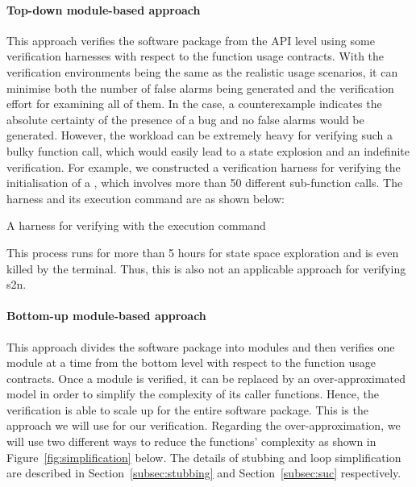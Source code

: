 \paragraph{Top-down module-based approach} This approach verifies the software package from the API level using some verification harnesses with respect to the function usage contracts. With the verification environments being the same as the realistic usage scenarios, it can minimise both the number of false alarms being generated and the verification effort for examining all of them. In the case, a counterexample indicates the absolute certainty of the presence of a bug and no false alarms would be generated.
However, the workload can be extremely heavy for verifying such a bulky function call, which would easily lead to a state explosion and an indefinite verification. For example, we constructed a verification harness for verifying the initialisation of a , which involves more than 50 different sub-function calls. The harness and its execution command are as shown below:

\begin{listing}[ht]


\caption{A harness for verifying  with the execution command}
\label{listing:s2n_test_harness}
\end{listing}

This process runs for more than 5 hours for state space exploration and is even killed by the terminal. Thus, this is also not an applicable approach for verifying s2n.

\paragraph{Bottom-up module-based approach} This approach divides the software package into modules and then verifies one module at a time from the bottom level with respect to the function usage contracts. Once a module is verified, it can be replaced by an over-approximated model in order to simplify the complexity of its caller functions. Hence, the verification is able to scale up for the entire software package. This is the approach we will use for our verification. Regarding the over-approximation, we will use two different ways to reduce the functions' complexity as shown in Figure~\ref{fig:simplification} below.
The details of stubbing and loop simplification are described in Section~\ref{subsec:stubbing} and Section~\ref{subsec:suc} respectively.

